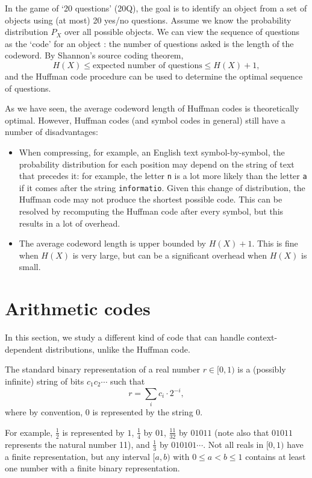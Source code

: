\begin{example}[20 questions]
In the game of `20 questions' (20Q), the goal is to identify an object from a set of objects using (at most) 20 yes/no questions. Assume we know the probability distribution $P_X$ over all possible objects. We can view the sequence of questions as the `code' for an object : the number of questions asked is the length of the codeword. By Shannon's source coding theorem,
\[
H(X) \leq \mbox{expected number of questions} \leq H(X) + 1,
\]
and the Huffman code procedure can be used to determine the optimal sequence of questions.
\end{example}
As we have seen, the average codeword length of Huffman codes is theoretically optimal. However, Huffman codes (and symbol codes in general) still have a number of disadvantages:
\begin{itemize}
\item When compressing, for example, an English text symbol-by-symbol, the probability distribution for each position may depend on the string of text that precedes it: for example, the letter \texttt{n} is a lot more likely than the letter \texttt{a} if it comes after the string \texttt{informatio}. Given this change of distribution, the Huffman code may not produce the shortest possible code. This can be resolved by recomputing the Huffman code after every symbol, but this results in a lot of overhead.
\item The average codeword length is upper bounded by $H(X) + 1$. This is fine when $H(X)$ is very large, but can be a significant overhead when $H(X)$ is small.
\end{itemize}

\section{Arithmetic codes}
In this section, we study a different kind of code that can handle context-dependent distributions, unlike the Huffman code.

\begin{definition}
The standard binary representation of a real number $r \in [0,1)$ is a (possibly infinite) string of bits $c_1c_2\cdots$ such that
\[
r = \sum_i c_i \cdot 2^{-i},
\]
where by convention, 0 is represented by the string 0.
\end{definition}
For example, $\frac{1}{2}$ is represented by $1$, $\frac{1}{4}$ by $01$, $\frac{11}{32}$ by $01011$ (note also that $01011$ represents the natural number 11), and $\frac{1}{3}$ by $010101\cdots$. Not all reals in $[0,1)$ have a finite representation, but any interval $[a,b)$ with $0 \leq a < b \leq 1$ contains at least one number with a finite binary representation.


